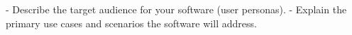    - Describe the target audience for your software (user personas).
   - Explain the primary use cases and scenarios the software will address.